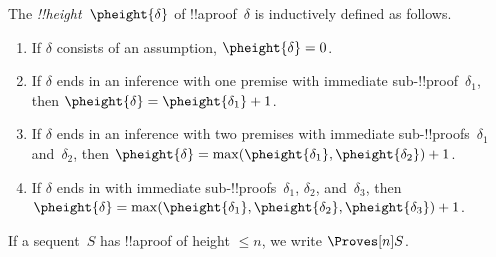 \documentclass[../../../include/open-logic-section]{subfiles}
\begin{document}


\begin{defn}
The \emph{!!{height}}~$\pheight{\delta}$ of !!a{proof}~$\delta$ is
inductively defined as follows.
\begin{enumerate}
  \item If $\delta$ consists of an assumption, $\pheight{\delta} = 0$.
  \item If $\delta$ ends in an inference with one premise with immediate
  sub-!!{proof}~$\delta_1$, then $\pheight{\delta} = \pheight{\delta_1} + 1$.
  \item If $\delta$ ends in an inference with two premises with immediate
  sub-!!{proof}s~$\delta_1$ and~$\delta_2$, then $\pheight{\delta} =
  \max(\pheight{\delta_1}, \pheight{\delta_2}) + 1$.
  \item If $\delta$ ends in \Elim{\lor} with immediate
  sub-!!{proof}s~$\delta_1$, $\delta_2$, and~$\delta_3$, then $\pheight{\delta} =
  \max(\pheight{\delta_1}, \pheight{\delta_2}, \pheight{\delta_3}) + 1$.
\end{enumerate}
If a sequent~$S$ has !!a{proof} of height $\le n$, we write $\Proves[n] S$.
\end{defn}
\end{document}
